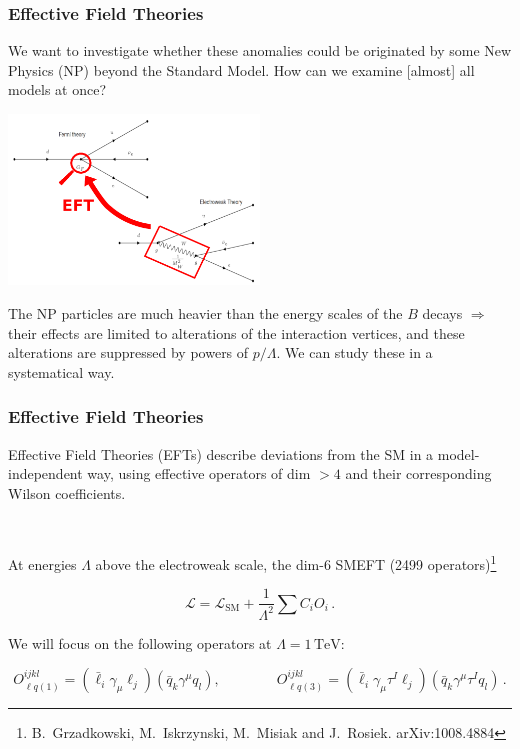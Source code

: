 \documentclass[mathserif, 10pt]{beamer}
\begin{document}
\begin{frame}
    \frametitle{Effective Field Theories}
    We want to investigate whether these anomalies could be originated by some New Physics (NP) beyond the Standard Model. How can we examine [almost] all models at once?
    \begin{center}
        \includegraphics[width=0.5\textwidth]{figures/EFT.png}
    \end{center}
    The NP particles are much heavier than the energy scales of the $B$ decays $\Longrightarrow$ their effects are limited to alterations of the interaction vertices, and these alterations are suppressed by powers of $p/\Lambda$. We can study these in a systematical way.
\end{frame}

\begin{frame}
    \frametitle{Effective Field Theories}

    Effective Field Theories (EFTs) describe deviations from the SM in a model-independent way, using effective operators of dim $>4$ and their corresponding Wilson coefficients.

    ~

    At energies $\Lambda$ above the electroweak scale, the dim-6 SMEFT (2499 operators)\footnote[1]{B.~Grzadkowski, M.~Iskrzynski, M.~Misiak and J.~Rosiek. arXiv:1008.4884}

    $$\mathcal{L} = \mathcal{L}_\mathrm{SM} + \frac{1}{\Lambda^2}\sum C_i O_i\,.$$

    We will focus on the following operators at $\Lambda = 1\,\mathrm{TeV}$:

    $$O_{\ell q(1)}^{ijkl} = (\bar{\ell}_i \gamma_\mu \ell_j)(\bar{q}_k \gamma^\mu  q_l),\qquad\qquad O_{\ell q(3)}^{ijkl}= (\bar{\ell}_i \gamma_\mu \tau^I \ell_j)(\bar{q}_k \gamma^\mu \tau^I q_l)\,.$$

\end{frame}
\end{document}
